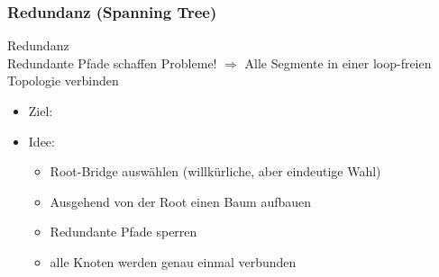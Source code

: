 \columnbreak

\subsubsection{Redundanz (Spanning Tree)}

\begin{concept}{Redundanz}\\
    Redundante Pfade schaffen Probleme! $\Rightarrow$ Alle Segmente in einer loop-freien Topologie verbinden
    \begin{itemize}
        \item Ziel: 
        \item Idee:
        \begin{itemize}
            \item Root-Bridge auswählen (willkürliche, aber eindeutige Wahl) 
            \item Ausgehend von der Root einen Baum aufbauen
            \item Redundante Pfade sperren
            \item alle Knoten werden genau einmal verbunden
        \end{itemize}
    \end{itemize}
\end{concept}

